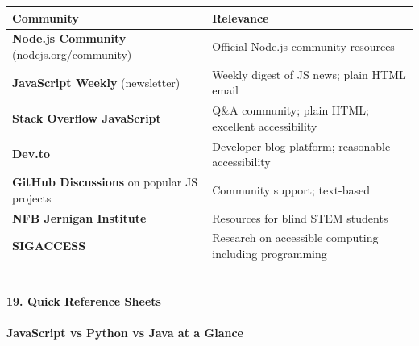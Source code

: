 \documentclass[
  justified,
  openright,
]{tufte-book}
\let\subsection\paragraph
\let\paragraph\paragraph
\let\subsection\paragraph
\let\paragraph\paragraph
\begin{document}
\begin{fullwidth}{\def\LTcaptype{none} %
\begin{longtable}[]{@{}
  >{\raggedright\arraybackslash}p{}
  >{\raggedright\arraybackslash}p{}@{}}
\toprule\noalign{}
\begin{minipage}[b]{\linewidth}\raggedright
Community
\end{minipage} & \begin{minipage}[b]{\linewidth}\raggedright
Relevance
\end{minipage} \\
\midrule\noalign{}
\endhead
\bottomrule\noalign{}
\endlastfoot
\textbf{Node.js Community} (nodejs.org/community) & Official Node.js
community resources \\
\textbf{JavaScript Weekly} (newsletter) & Weekly digest of JS news;
plain HTML email \\
\textbf{Stack Overflow JavaScript} & Q\&A community; plain HTML;
excellent accessibility \\
\textbf{Dev.to} & Developer blog platform; reasonable accessibility \\
\textbf{GitHub Discussions} on popular JS projects & Community support;
text-based \\
\textbf{NFB Jernigan Institute} & Resources for blind STEM students \\
\textbf{SIGACCESS} & Research on accessible computing including
programming \\
\end{longtable}
}
\end{fullwidth}

\begin{center}\rule{0.5\linewidth}{0.5pt}\end{center}

\subsection{19. Quick Reference Sheets}\label{quick-reference-sheets-1}

\subsection{JavaScript vs Python vs Java at a
Glance}\label{javascript-vs-python-vs-java-at-a-glance}
\end{document}
